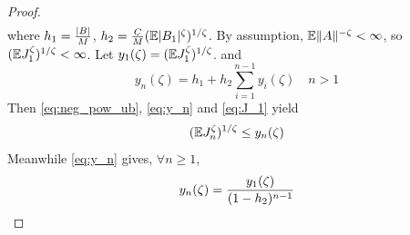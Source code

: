 \documentclass[aoas,preprint]{imsart}
\numberwithin{equation}{section}
\theoremstyle{plain}
\begin{document}
\begin{proof}
\begin{eqnarray}
    \nonumber
  \end{eqnarray}
  where $h_1 = {|B| \over M}$,
  $h_2 = {C \over M} (\mathbb{E} |B_1|^\zeta)^{1/\zeta}$.
  By assumption, $\mathbb{E} \|A\|^{-\zeta} < \infty$, so
  $(\mathbb{E} J_1^\zeta)^{1/\zeta} < \infty$.
  Let $y_1(\zeta) = (\mathbb{E} J_1^\zeta)^{1/\zeta}$.
  and
  \begin{equation}
    \label{eq:y_n}
    y_n(\zeta) = h_1 + h_2 \sum_{i=1}^{n-1} y_i(\zeta)
    \quad
    n > 1
  \end{equation}
  Then \eqref{eq:neg_pow_ub}, \eqref{eq:y_n} and \eqref{eq:J_1}
  yield
  \begin{equation}
    \label{eq:J_n_2}
    (\mathbb{E} J_n^\zeta)^{1/\zeta} \leq y_n(\zeta)
  \end{equation}
  Meanwhile \eqref{eq:y_n} gives, $\forall n \geq 1$,
  \begin{equation}
    \label{eq:y_n_2}
    y_n(\zeta) = {y_1(\zeta) \over (1 - h_2)^{n-1}}
  \end{equation}


\end{proof}
\end{document}
